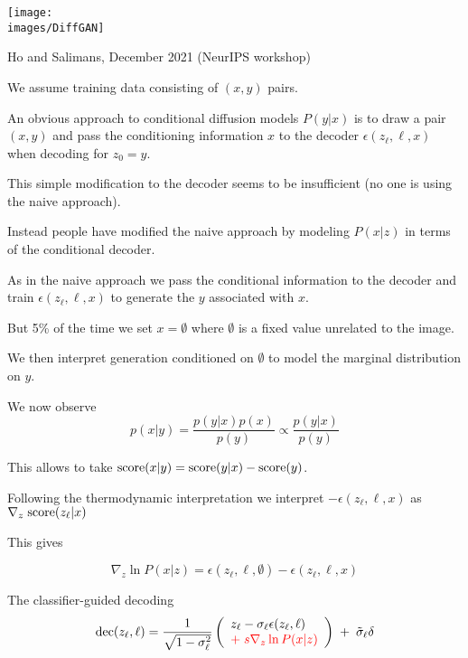 {

\centerline{\texttt{[image: \\images/DiffGAN]}}

{Ho and Salimans, December 2021 (NeurIPS workshop)}

We assume training data consisting of $(x,y)$ pairs.

\vfill
An obvious approach to conditional diffusion models $P(y|x)$ is to draw a pair $(x,y)$ and pass the conditioning information $x$ to the decoder
$\epsilon(z_\ell,\ell,x)$ when decoding for $z_0 = y$.

\vfill
This simple modification to the decoder seems to be insufficient (no one is using the naive approach).

\vfill
Instead people have modified the naive approach by modeling $P(x|z)$ in terms of the conditional decoder.


As in the naive approach we pass the conditional information to the decoder and train $\epsilon(z_\ell,\ell,x)$ to generate the $y$ associated with $x$.

\vfill
But 5\% of the time we set $x = \emptyset$ where $\emptyset$ is a fixed value unrelated to the image.

\vfill
We then interpret generation conditioned on $\emptyset$ to model the marginal distribution on $y$.


We now observe
$$p(x|y) = \frac{p(y|x)p(x)}{p(y)} \propto \frac{p(y|x)}{p(y)}$$

\vfill
This allows to take $\mathrm{score}(x|y) = \mathrm{score}(y|x) - \mathrm{score}(y)$.

\vfill
Following the thermodynamic interpretation we interpret $- \epsilon(z_\ell,\ell,x)$ as $\nabla_z\; \mathrm{score}(z_\ell|x)$

\vfill
This gives

$$\nabla_z \ln P(x|z) = \epsilon(z_\ell,\ell,\emptyset) - \epsilon(z_\ell,\ell,x)$$



The classifier-guided decoding
$$\mathrm{dec}(z_\ell,\ell) = \frac{1}{\sqrt{1-\sigma_\ell^2}}\left(
\begin{array}{l}z_\ell - \sigma_\ell \epsilon(z_\ell,\ell) \\
  {\color{red} +  \; s \nabla_{z} \ln P(x|z)}\end{array}\right)\; +\; \tilde{\sigma}_\ell\delta$$

}
